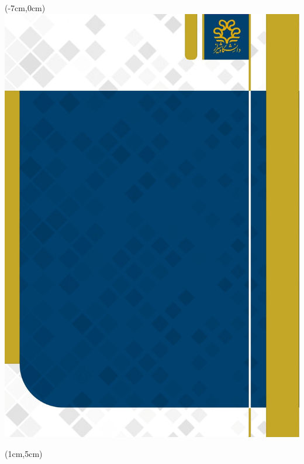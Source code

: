 \begin{textblock*}{\paperheight}(-7cm,0cm)
        \includegraphics[width=\paperwidth,height=\paperheight]{assets/front_cover}
\end{textblock*}

\begin{textblock*}{12.5cm}(1cm,5cm)
    \textcolor{white}{\small \textbf{{\PersianType} {\PersianDegree}}}

    \vspace{\baselineskip}
    \textcolor{white}{\textbf{\PersianTitle}}

    \vspace{\baselineskip}
    \textcolor{white}{\textbf{\PersianName}}
\end{textblock*}

